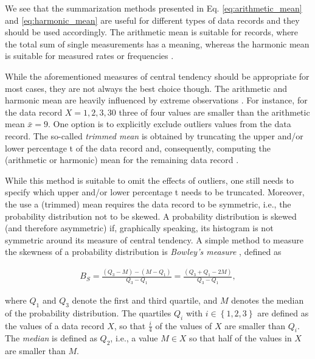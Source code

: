 We see that the summarization methods presented in Eq. \ref{eq:arithmetic_mean}
and \ref{eq:harmonic_mean} are useful for different types of data records and they should
be used accordingly. The arithmetic mean is suitable for records, where the total sum of single
measurements has a meaning, whereas the harmonic mean is suitable for measured
rates or frequencies \citep{smith_characterizing_1988}.

While the aforementioned measures of central tendency should be appropriate for
most cases, they are not always the best choice though. The arithmetic
and harmonic mean are heavily influenced by extreme observations
\citep{shanmugam_statistics_2015}. For instance, for the data record $X = 1, 2, 3, 30$ three of four values are smaller than the
arithmetic mean $\bar{x} = 9$. One option is to explicitly exclude outliers
values from the data record. The so-called \emph{trimmed mean} is
obtained by truncating the upper and/or lower percentage t of the data record
and, consequently, computing the (arithmetic or harmonic) mean for the remaining
data record \citep{shanmugam_statistics_2015}. 

While this method is suitable to omit the effects of outliers, one still needs to specify
which upper and/or lower percentage t needs to be truncated. Moreover, the use
a (trimmed) mean requires the data record to be symmetric, i.e., the
probability distribution not to be skewed. A probability distribution is skewed
(and therefore asymmetric) if, graphically speaking, its histogram is not
symmetric around its measure of central tendency. A simple method to measure the
skewness of a probability distribution is \emph{Bowley's measure}
\cite[p.~94]{shanmugam_statistics_2015}, defined as

\begin{equation} \label{eq:bowley}
\begin{split}
B_S = \frac{(Q_3 - M) - (M - Q_1)}{Q_3 - Q_1} = \frac{(Q_3 + Q_1 - 2M)}{Q_3
- Q_1},
\end{split}
\end{equation}

where $Q_1$ and $Q_3$ denote the first and third quartile, and $M$ denotes the
median of the probability distribution. The quartiles $Q_i$ with $i \in \left\{
1,2,3 \right\}$ are defined as the values of a data record $X$, so that
$\frac{i}{4}$ of the values of $X$ are smaller than $Q_i$. The \emph{median} is
defined as $Q_2$, i.e., a value $M \in X$ so that half of the values in $X$ are smaller than $M$.

